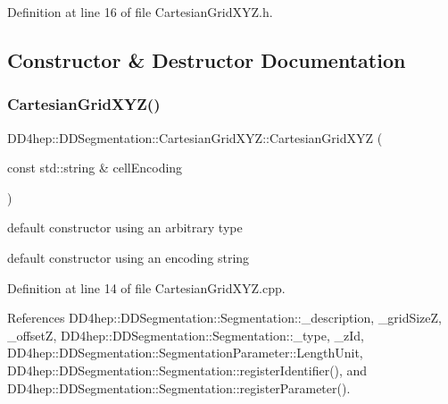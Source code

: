 Definition at line 16 of file Cartesian\+Grid\+X\+Y\+Z.\+h.



\subsection{Constructor \& Destructor Documentation}
\hypertarget{class_d_d4hep_1_1_d_d_segmentation_1_1_cartesian_grid_x_y_z_a1e888c86452db8dc811b59c7b3298b04}{}\label{class_d_d4hep_1_1_d_d_segmentation_1_1_cartesian_grid_x_y_z_a1e888c86452db8dc811b59c7b3298b04} 
\subsubsection{\texorpdfstring{Cartesian\+Grid\+X\+Y\+Z()}{CartesianGridXYZ()}\hspace{0.1cm}{\footnotesize\ttfamily [1/2]}}
{\footnotesize\ttfamily D\+D4hep\+::\+D\+D\+Segmentation\+::\+Cartesian\+Grid\+X\+Y\+Z\+::\+Cartesian\+Grid\+X\+YZ (\begin{DoxyParamCaption}\item[{const std\+::string \&}]{cell\+Encoding }\end{DoxyParamCaption})}



default constructor using an arbitrary type 

default constructor using an encoding string 

Definition at line 14 of file Cartesian\+Grid\+X\+Y\+Z.\+cpp.



References D\+D4hep\+::\+D\+D\+Segmentation\+::\+Segmentation\+::\+\_\+description, \+\_\+grid\+SizeZ, \+\_\+offsetZ, D\+D4hep\+::\+D\+D\+Segmentation\+::\+Segmentation\+::\+\_\+type, \+\_\+z\+Id, D\+D4hep\+::\+D\+D\+Segmentation\+::\+Segmentation\+Parameter\+::\+Length\+Unit, D\+D4hep\+::\+D\+D\+Segmentation\+::\+Segmentation\+::register\+Identifier(), and D\+D4hep\+::\+D\+D\+Segmentation\+::\+Segmentation\+::register\+Parameter().

\hypertarget{class_d_d4hep_1_1_d_d_segmentation_1_1_cartesian_grid_x_y_z_a0667982b480a2fea3f70a16d8f236e22}{}\label{class_d_d4hep_1_1_d_d_segmentation_1_1_cartesian_grid_x_y_z_a0667982b480a2fea3f70a16d8f236e22} 

